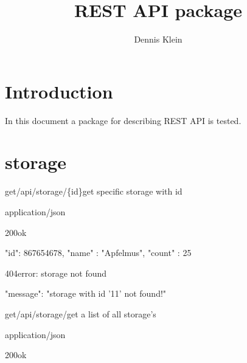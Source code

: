 \documentclass[12pt,a4paper]{article}
\title{REST API package}
\author{Dennis Klein}
\date{}
\begin{document}
\maketitle

\section{Introduction}
In this document a package for describing REST API is tested. 

\pagebreak



\section{storage}

\begin{apiRoute}{get}{/api/storage/\{id\}}{get specific storage with id}
	
	\begin{routeParameter}
	\end{routeParameter}
	\begin{routeResponse}{application/json}
		\begin{routeResponseItem}{200}{ok}
			\begin{routeResponseItemBody}
{     
	"id": 867654678,
	"name" : "Apfelmus",
	"count" : 25
}
			\end{routeResponseItemBody}
		\end{routeResponseItem}
		\begin{routeResponseItem}{404}{error: storage not found}
			\begin{routeResponseItemBody}
{
	"message": "storage with id '11' not found!"
}
			\end{routeResponseItemBody}
		\end{routeResponseItem}
	\end{routeResponse}
	
\end{apiRoute}



\begin{apiRoute}{get}{/api/storage/}{get a list of all storage's}
	\begin{routeParameter}
		\noRouteParamter{no parameter}
	\end{routeParameter}
	\begin{routeResponse}{application/json}
		\begin{routeResponseItem}{200}{ok}
			\begin{routeResponseItemBody}
			\end{routeResponseItemBody}
		\end{routeResponseItem}
	\end{routeResponse}
\end{apiRoute}
\end{document}
